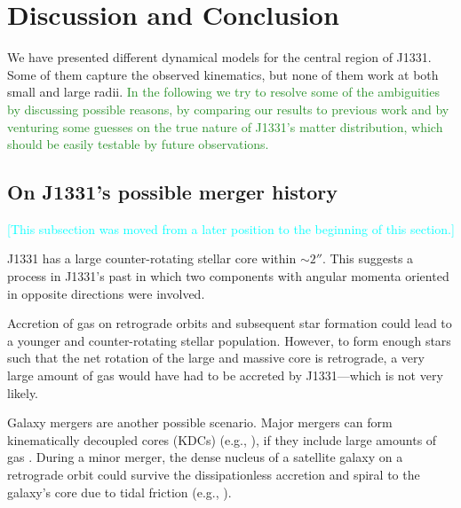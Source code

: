 \documentclass[useAMS,usenatbib]{mnras}
\newcommand{\NOTE}[1]{\textcolor{Cyan}{#1}}
\newcommand{\NEW}[1]{\textcolor{ForestGreen}{#1}}
\newcommand{\OLD}[1]{}
\begin{document}
\section{Discussion and Conclusion} \label{sec:Discussion}

We have presented different dynamical models for the central region of J1331. Some of them capture the observed kinematics, but none of them work at both small and large radii. \NEW{In the following we try to resolve some of the ambiguities by discussing possible reasons, by comparing our results to previous work and by venturing some guesses on the true nature of J1331's matter distribution, which should be easily testable by future observations.}\OLD{In the following we discuss possible reasons, also by comparing our results to previous work.}

\subsection{On J1331's possible merger history\OLD{ and modelling failures}} \label{sec:discussion_merger}
\NOTE{[This subsection was moved from a later position to the beginning of this section.]}

J1331 has a large counter-rotating stellar core within $\sim 2''$. This suggests a process in J1331's past in which two components with angular momenta oriented in opposite directions were involved.

Accretion of gas on retrograde orbits and subsequent star formation could lead to a younger and counter-rotating stellar population. However, to form enough stars such that the net rotation of the large and massive core is retrograde, a very large amount of gas would have had to be accreted by J1331---which is not very likely. 

Galaxy mergers are another possible scenario. Major mergers can form kinematically decoupled cores (KDCs) (e.g., \citealt{2011MNRAS.414.2923K,2015ApJ...802L...3T}), if they include large amounts of gas \citep{2010ApJ...723..818H}. During a minor merger, the dense nucleus of a satellite galaxy on a retrograde orbit could survive the dissipationless accretion and spiral to the galaxy's core due to tidal friction (e.g., \citealt{1984ApJ...287..577K,1988ApJ...327L..55F}). 
\end{document}
